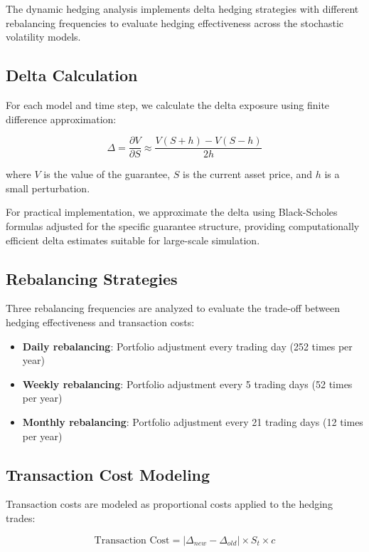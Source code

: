 \documentclass[12pt,a4paper]{report}
\begin{document}
The dynamic hedging analysis implements delta hedging strategies with different rebalancing frequencies to evaluate hedging effectiveness across the stochastic volatility models.

\subsection{Delta Calculation}

For each model and time step, we calculate the delta exposure using finite difference approximation:

\begin{equation}
\Delta = \frac{\partial V}{\partial S} \approx \frac{V(S+h) - V(S-h)}{2h}
\end{equation}

where $V$ is the value of the guarantee, $S$ is the current asset price, and $h$ is a small perturbation.

For practical implementation, we approximate the delta using Black-Scholes formulas adjusted for the specific guarantee structure, providing computationally efficient delta estimates suitable for large-scale simulation.

\subsection{Rebalancing Strategies}

Three rebalancing frequencies are analyzed to evaluate the trade-off between hedging effectiveness and transaction costs:

\begin{itemize}
\item \textbf{Daily rebalancing}: Portfolio adjustment every trading day (252 times per year)
\item \textbf{Weekly rebalancing}: Portfolio adjustment every 5 trading days (52 times per year)
\item \textbf{Monthly rebalancing}: Portfolio adjustment every 21 trading days (12 times per year)
\end{itemize}

\subsection{Transaction Cost Modeling}

Transaction costs are modeled as proportional costs applied to the hedging trades:

\begin{equation}
\text{Transaction Cost} = |\Delta_{new} - \Delta_{old}| \times S_t \times c
\end{equation}
\end{document}
